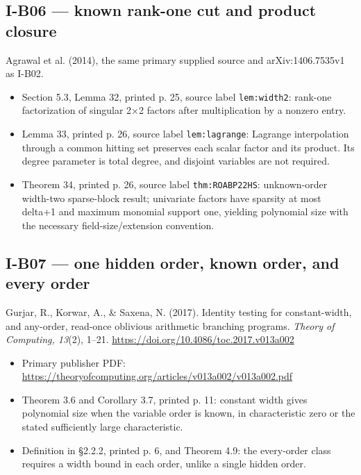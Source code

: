 \documentclass[11pt,a4paper]{article}
\providecommand{\tightlist}{\setlength{\itemsep}{0pt}\setlength{\parskip}{0pt}}
\theoremstyle{definition}\newtheorem{definition}{Definition}
\begin{document}
\subsection{I-B06 --- known rank-one cut and product
closure}\label{i-b06--known-rank-one-cut-and-product-closure}

Agrawal et al. (2014), the same primary supplied source and
arXiv:1406.7535v1 as I-B02.

\begin{itemize}
\tightlist
\item
  Section 5.3, Lemma 32, printed p. 25, source label
  \nolinkurl{lem:width2}: rank-one factorization of singular 2×2 factors
  after multiplication by a nonzero entry.
\item
  Lemma 33, printed p. 26, source label \nolinkurl{lem:lagrange}: Lagrange
  interpolation through a common hitting set preserves each scalar
  factor and its product. Its degree parameter is total degree, and
  disjoint variables are not required.
\item
  Theorem 34, printed p. 26, source label \nolinkurl{thm:ROABP22HS}:
  unknown-order width-two sparse-block result; univariate factors have
  sparsity at most delta+1 and maximum monomial support one, yielding
  polynomial size with the necessary field-size/extension convention.
\end{itemize}

\subsection{I-B07 --- one hidden order, known order, and every
order}\label{i-b07--one-hidden-order-known-order-and-every-order}

Gurjar, R., Korwar, A., \& Saxena, N. (2017). Identity testing for
constant-width, and any-order, read-once oblivious arithmetic branching
programs. \emph{Theory of Computing, 13}(2), 1--21.
\url{https://doi.org/10.4086/toc.2017.v013a002}

\begin{itemize}
\tightlist
\item
  Primary publisher PDF:
  \url{https://theoryofcomputing.org/articles/v013a002/v013a002.pdf}
\item
  Theorem 3.6 and Corollary 3.7, printed p. 11: constant width gives
  polynomial size when the variable order is known, in characteristic
  zero or the stated sufficiently large characteristic.
\item
  Definition in §2.2.2, printed p. 6, and Theorem 4.9: the every-order
  class requires a width bound in each order, unlike a single hidden
  order.
\end{itemize}
\end{document}
